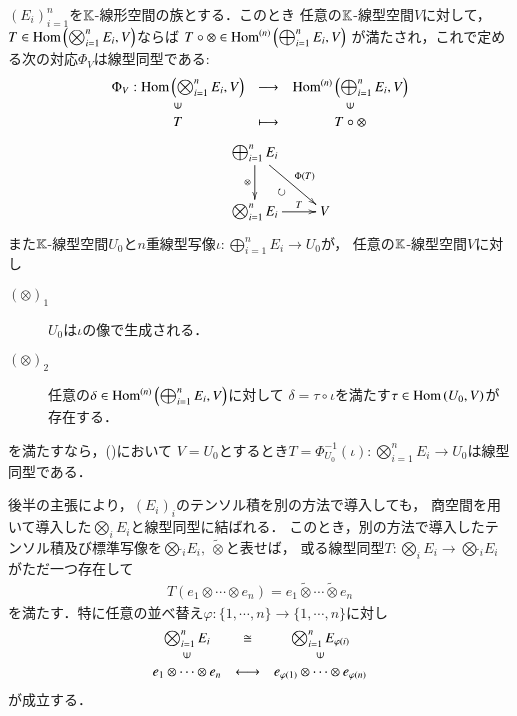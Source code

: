 	\begin{screen}
		\begin{thm}
		\label{thm:universality_of_tensor_product}
			$(E_i)_{i=1}^n$を$\K$-線形空間の族とする．このとき
			任意の$\K$-線型空間$V$に対して，$T \in \Hom{\bigotimes_{i=1}^n E_i}{V}$ならば
			$T \circ \otimes \in \Ln{\bigoplus_{i=1}^n E_i}{V}{n}$
			が満たされ，これで定める次の対応$\Phi_V$は線型同型である:
			\begin{align}
				\begin{array}{ccc}
					\Phi_V:\Hom{\bigotimes_{i=1}^n E_i}{V} & \longrightarrow & \Ln{\bigoplus_{i=1}^n E_i}{V}{n} \\
					\rotatebox{90}{$\in$} & & \rotatebox{90}{$\in$} \\
					T & \longmapsto & T \circ \otimes 
					\label{eq:thm_universality_of_tensor_product}
				\end{array}
			\end{align}
			\begin{align}
				\xymatrix{
					&\bigoplus_{i=1}^n E_i \ar[d]_-\otimes \ar[rd]^-{\Phi(T)} & \\
					&\bigotimes_{i=1}^n E_i \ar[r]^-T & V \ar@{}[lu]<2ex>|\circlearrowright
				}
			\end{align}
			また$\K$-線型空間$U_0$と$n$重線型写像$\iota:\bigoplus_{i=1}^n E_i \longrightarrow U_0$が，
			任意の$\K$-線型空間$V$に対し
			\begin{description}
				\item[$(\otimes)_1$] $U_0$は$\iota$の像で生成される．
				\item[$(\otimes)_2$] 任意の$\delta \in \Ln{\bigoplus_{i=1}^n E_i}{V}{n}$に対して
					$\delta = \tau \circ \iota$を満たす$\tau \in \Hom{U_0}{V}$が存在する．
			\end{description}
			を満たすなら，()において
			$V = U_0$とするとき$T = \Phi_{U_0}^{-1}(\iota):
			\bigotimes_{i=1}^n E_i \longrightarrow U_0$は線型同型である．
		\end{thm}
	\end{screen}
	後半の主張により，$(E_i)_i$のテンソル積を別の方法で導入しても，
	商空間を用いて導入した$\bigotimes_i E_i$と線型同型に結ばれる．
	このとき，別の方法で導入したテンソル積及び標準写像を$\bigotimes\tilde{ }_i E_i,\ \tilde{\otimes}$と表せば，
	或る線型同型$T:\bigotimes_i E_i \longrightarrow \bigotimes\tilde{ }_i E_i$がただ一つ存在して
	\begin{align}
		T(e_1 \otimes \cdots \otimes e_n) = e_1 \tilde{\otimes} \cdots \tilde{\otimes} e_n 
	\end{align}
	を満たす．特に任意の並べ替え$\varphi:\{1,\cdots,n\} \longrightarrow \{1,\cdots,n\}$に対し
	\begin{align}
		\begin{array}{ccc}
		\bigotimes_{i=1}^{n} E_i & \cong & \bigotimes_{i=1}^{n} E_{\varphi(i)} \\
		\rotatebox{90}{$\in$} & & \rotatebox{90}{$\in$} \\
		e_1 \otimes \cdots \otimes e_n & \longleftrightarrow & e_{\varphi(1)} \otimes \cdots \otimes e_{\varphi(n)}
		\end{array}
	\end{align}
	が成立する．
	
